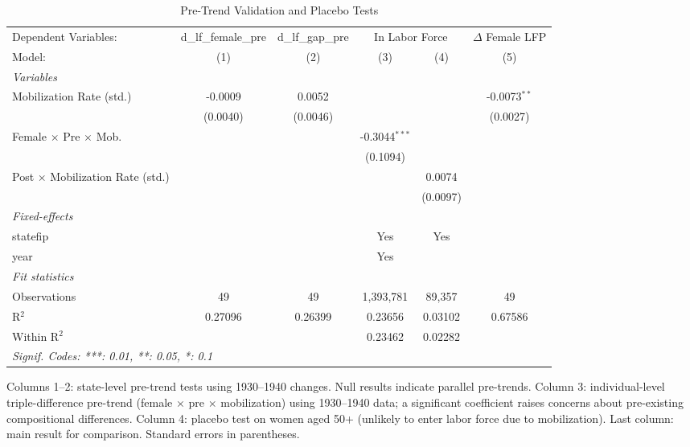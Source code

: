 
\begin{table}[htbp]
   \caption{\label{tab:pretrends} Pre-Trend Validation and Placebo Tests}
   \centering
   \begin{tabular}{lccccc}
      \tabularnewline \midrule \midrule
      Dependent Variables: & d\_lf\_female\_pre & d\_lf\_gap\_pre & \multicolumn{2}{c}{In Labor Force} & $\Delta$ Female LFP\\
      Model:                                  & (1)      & (2)      & (3)             & (4)      & (5)\\  
      \midrule
      \emph{Variables}\\
      Mobilization Rate (std.)                & -0.0009  & 0.0052   &                 &          & -0.0073$^{**}$\\   
                                              & (0.0040) & (0.0046) &                 &          & (0.0027)\\   
      Female $\times$ Pre $\times$ Mob.       &          &          & -0.3044$^{***}$ &          &   \\   
                                              &          &          & (0.1094)        &          &   \\   
      Post $\times$ Mobilization Rate (std.)  &          &          &                 & 0.0074   &   \\   
                                              &          &          &                 & (0.0097) &   \\   
      \midrule
      \emph{Fixed-effects}\\
      statefip                                &          &          & Yes             & Yes      & \\  
      year                                    &          &          & Yes             &          & \\  
      \midrule
      \emph{Fit statistics}\\
      Observations                            & 49       & 49       & 1,393,781       & 89,357   & 49\\  
      R$^2$                                   & 0.27096  & 0.26399  & 0.23656         & 0.03102  & 0.67586\\  
      Within R$^2$                            &          &          & 0.23462         & 0.02282  & \\  
      \midrule \midrule
      \multicolumn{6}{l}{\emph{Signif. Codes: ***: 0.01, **: 0.05, *: 0.1}}\\
   \end{tabular}
   
   \par \raggedright 
   Columns 1--2: state-level pre-trend tests using 1930--1940 changes. Null results indicate parallel pre-trends. Column 3: individual-level triple-difference pre-trend (female $\times$ pre $\times$ mobilization) using 1930--1940 data; a significant coefficient raises concerns about pre-existing compositional differences. Column 4: placebo test on women aged 50+ (unlikely to enter labor force due to mobilization). Last column: main result for comparison. Standard errors in parentheses.
\end{table}


